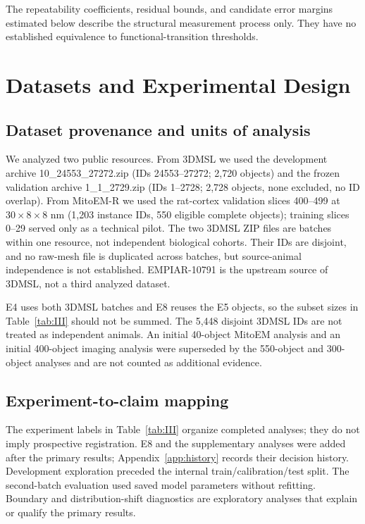 \documentclass[journal]{IEEEtran}
\begin{document}
The repeatability coefficients, residual bounds, and candidate error margins estimated below describe the structural measurement process only. They have no established equivalence to functional-transition thresholds.

\section{Datasets and Experimental Design}

\subsection{Dataset provenance and units of analysis}

We analyzed two public resources. From 3DMSL \cite{ref12} we used the development archive 10\_24553\_27272.zip (IDs 24553--27272; 2,720 objects) and the frozen validation archive 1\_1\_2729.zip (IDs 1--2728; 2,728 objects, none excluded, no ID overlap). From MitoEM-R \cite{ref15} we used the rat-cortex validation slices 400--499 at $30\times8\times8$ nm (1,203 instance IDs, 550 eligible complete objects); training slices 0--29 served only as a technical pilot. The two 3DMSL ZIP files are batches within one resource, not independent biological cohorts. Their IDs are disjoint, and no raw-mesh file is duplicated across batches, but source-animal independence is not established. EMPIAR-10791 is the upstream source of 3DMSL, not a third analyzed dataset.



E4 uses both 3DMSL batches and E8 reuses the E5 objects, so the subset sizes in Table~\ref{tab:III} should not be summed. The 5,448 disjoint 3DMSL IDs are not treated as independent animals. An initial 40-object MitoEM analysis and an initial 400-object imaging analysis were superseded by the 550-object and 300-object analyses and are not counted as additional evidence.

\subsection{Experiment-to-claim mapping}

The experiment labels in Table~\ref{tab:III} organize completed analyses; they do not imply prospective registration. E8 and the supplementary analyses were added after the primary results; Appendix~\ref{app:history} records their decision history. Development exploration preceded the internal train/calibration/test split. The second-batch evaluation used saved model parameters without refitting. Boundary and distribution-shift diagnostics are exploratory analyses that explain or qualify the primary results.
\end{document}
